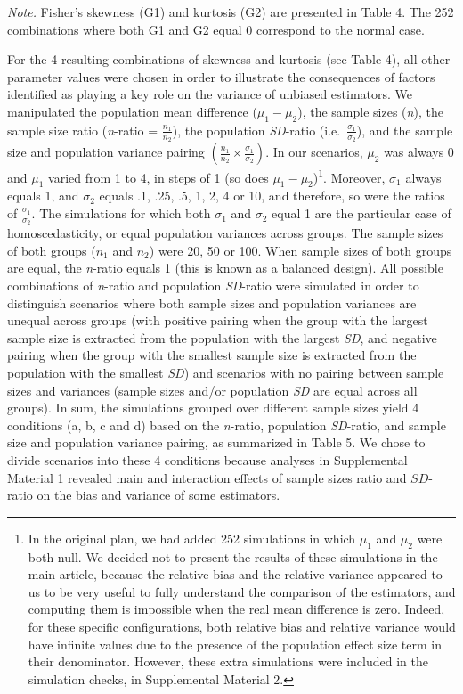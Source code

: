 \documentclass[
  english,
  man,floatsintext]{apa6}
\begin{document}
\emph{Note.} Fisher's skewness (G1) and kurtosis (G2) are presented in Table 4. The 252 combinations where both G1 and G2 equal 0 correspond to the normal case.

For the 4 resulting combinations of skewness and kurtosis (see Table 4), all other parameter values were chosen in order to illustrate the consequences of factors identified as playing a key role on the variance of unbiased estimators. We manipulated the population mean difference (\(\mu_1-\mu_2\)), the sample sizes (\emph{n}), the sample size ratio (\emph{n}-ratio = \(\frac{n_1}{n_2}\)), the population \emph{SD}-ratio (i.e.~\(\frac{\sigma_1}{\sigma_2}\)), and the sample size and population variance pairing \(\left(\frac{n_1}{n_2}\times\frac{\sigma_1}{\sigma_2} \right)\). In our scenarios, \(\mu_2\) was always 0 and \(\mu_1\) varied from 1 to 4, in steps of 1 (so does \(\mu_1-\mu_2\))\footnote{In the original plan, we had added 252 simulations in which $\mu_1$ and $\mu_2$ were both null. We decided not to present the results of these simulations in the main article, because the relative bias and the relative variance appeared to us to be very useful to fully understand the comparison of the estimators, and computing them is impossible when the real mean difference is zero. Indeed, for these specific configurations, both relative bias and relative variance would have infinite values due to the presence of the population effect size term in their denominator. However, these extra simulations were included in the simulation checks, in Supplemental Material 2. }. Moreover, \(\sigma_1\) always equals 1, and \(\sigma_2\) equals .1, .25, .5, 1, 2, 4 or 10, and therefore, so were the ratios of \(\frac{\sigma_1}{\sigma_2}\). The simulations for which both \(\sigma_1\) and \(\sigma_2\) equal 1 are the particular case of homoscedasticity, or equal population variances across groups. The sample sizes of both groups (\(n_1\) and \(n_2\)) were 20, 50 or 100. When sample sizes of both groups are equal, the \emph{n}-ratio equals 1 (this is known as a balanced design). All possible combinations of \emph{n}-ratio and population \emph{SD}-ratio were simulated in order to distinguish scenarios where both sample sizes and population variances are unequal across groups (with positive pairing when the group with the largest sample size is extracted from the population with the largest \emph{SD}, and negative pairing when the group with the smallest sample size is extracted from the population with the smallest \emph{SD}) and scenarios with no pairing between sample sizes and variances (sample sizes and/or population \emph{SD} are equal across all groups). In sum, the simulations grouped over different sample sizes yield 4 conditions (a, b, c and d) based on the \emph{n}-ratio, population \emph{SD}-ratio, and sample size and population variance pairing, as summarized in Table 5. We chose to divide scenarios into these 4 conditions because analyses in Supplemental Material 1 revealed main and interaction effects of sample sizes ratio and \(SD\)-ratio on the bias and variance of some estimators.
\end{document}
